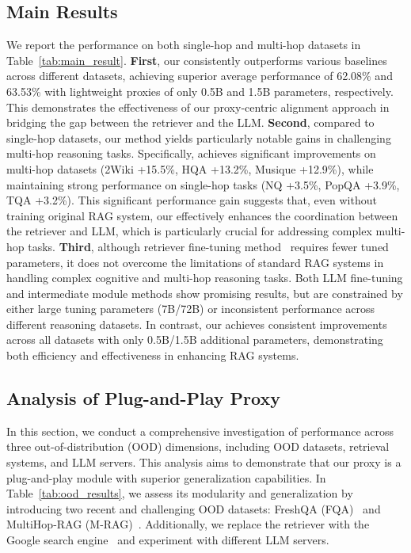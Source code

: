 \subsection{Main Results}
We report the performance on both single-hop and multi-hop datasets in Table~\ref{tab:main_result}.
\textbf{First}, our \modelname consistently outperforms various baselines across different datasets, achieving superior average performance of 62.08\% and 63.53\% with lightweight proxies of only 0.5B and 1.5B parameters, respectively.
This demonstrates the effectiveness of our proxy-centric alignment approach in bridging the gap between the retriever and the LLM.
\textbf{Second}, compared to single-hop datasets, our method yields particularly notable gains in challenging multi-hop reasoning tasks. Specifically, \modelname achieves significant improvements on multi-hop datasets (2Wiki +15.5\%, HQA +13.2\%, Musique +12.9\%), while maintaining strong performance on single-hop tasks (NQ +3.5\%, PopQA +3.9\%, TQA +3.2\%).
This significant performance gain suggests that, even without training original RAG system, our \modelname effectively enhances the coordination between the retriever and LLM, which is particularly crucial for addressing complex multi-hop tasks.
\textbf{Third}, although retriever fine-tuning method~\citep{ShiMYS0LZY24} requires fewer tuned parameters, it does not overcome the limitations of standard RAG systems in handling complex cognitive and multi-hop reasoning tasks.
Both LLM fine-tuning and intermediate module methods show promising results, but are constrained by either large tuning parameters (7B/72B) or inconsistent performance across different reasoning datasets.
In contrast, our \modelname achieves consistent improvements across all datasets with only 0.5B/1.5B additional parameters, demonstrating both efficiency and effectiveness in enhancing RAG systems.

\subsection{Analysis of Plug-and-Play Proxy}

In this section, we conduct a comprehensive investigation of performance across three out-of-distribution (OOD) dimensions, including OOD datasets, retrieval systems, and LLM servers. 
This analysis aims to demonstrate that our proxy is a plug-and-play module with superior generalization capabilities. 
In Table~\ref{tab:ood_results}, we assess its modularity and generalization by introducing two recent and challenging OOD datasets: FreshQA (FQA)~\citep{VuI0CWWTSZLL24} and MultiHop-RAG (M-RAG)~\citep{multihop_rag}. 
Additionally, we replace the retriever with the Google search engine~\citep{schmidt2014google} and experiment with different LLM servers.


